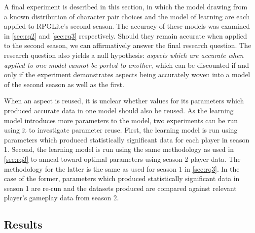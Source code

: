 A final experiment is described in this section, in which the model drawing from
a known distribution of character pair choices and the model of learning are
each applied to RPGLite's second season. The accuracy of these models was
examined in \cref{sec:rq2} and \cref{sec:rq3} respectively. Should they remain
accurate when applied to the second season, we can affirmatively answer the
final research question. The research question also yields a null hypothesis:
\emph{aspects which are accurate when applied to one model cannot be ported to
another}, which can be discounted if and only if the experiment
demonstrates aspects being accurately woven into a model of the second season as
well as the first. 

When an aspect is reused, it is unclear whether values for its parameters which
produced accurate data in one model should also be reused. As the learning model
introduces more parameters to the model, two experiments can be run using it to
investigate parameter reuse. First, the learning model is run using parameters
which produced statistically significant data for each player in season 1.
Second, the learning model is run using the same methodology as used in
\cref{sec:rq3} to anneal toward optimal parameters using season 2 player data.
The methodology for the latter is the same as used for season 1 in
\cref{sec:rq3}. In the case of the former, parameters which produced
statistically significant data in season 1 are re-run and the datasets produced
are compared against relevant player's gameplay data from season 2.


\subsection{Results}

